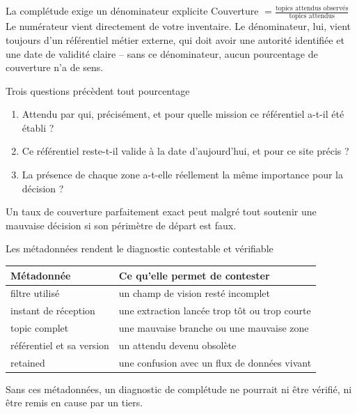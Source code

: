 \documentclass[aspectratio=169]{beamer}
\begin{document}
\begin{frame}{La complétude exige un dénominateur explicite}
\centering\Large Couverture $= \frac{\text{topics attendus observés}}{\text{topics attendus}}$
\vspace{1em}
\normalsize Le numérateur vient directement de votre inventaire. Le dénominateur, lui, vient toujours d'un référentiel métier externe, qui doit avoir une autorité identifiée et une date de validité claire -- sans ce dénominateur, aucun pourcentage de couverture n'a de sens.
\end{frame}

\begin{frame}{Trois questions précèdent tout pourcentage}
\begin{enumerate}
\item Attendu par qui, précisément, et pour quelle mission ce référentiel a-t-il été établi ?
\item Ce référentiel reste-t-il valide à la date d'aujourd'hui, et pour ce site précis ?
\item La présence de chaque zone a-t-elle réellement la même importance pour la décision ?
\end{enumerate}
Un taux de couverture parfaitement exact peut malgré tout soutenir une mauvaise décision si son périmètre de départ est faux.
\end{frame}

\begin{frame}{Les métadonnées rendent le diagnostic contestable et vérifiable}
\begin{tabular}{ll}
\toprule
Métadonnée & Ce qu'elle permet de contester \\
\midrule
filtre utilisé & un champ de vision resté incomplet \\
instant de réception & une extraction lancée trop tôt ou trop courte \\
topic complet & une mauvaise branche ou une mauvaise zone \\
référentiel et sa version & un attendu devenu obsolète \\
retained & une confusion avec un flux de données vivant \\
\bottomrule
\end{tabular}
\vfill
\normalsize Sans ces métadonnées, un diagnostic de complétude ne pourrait ni être vérifié, ni être remis en cause par un tiers.
\end{frame}
\end{document}
